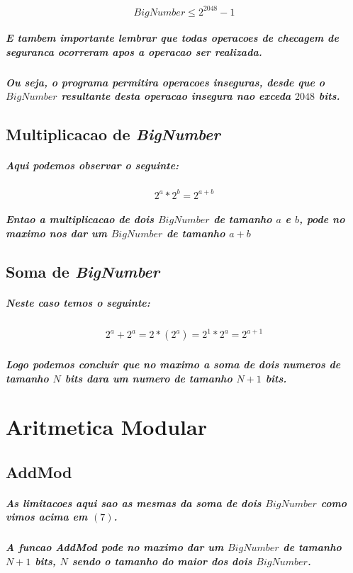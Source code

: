 \documentclass[12pt,twoside, a4paper, twocolumn]{article}
\begin{document}
\begin{equation}
    BigNumber \le 2^{2048} - 1
\end{equation}

\subparagraph*{E tambem importante lembrar que todas operacoes de checagem de seguranca ocorreram \emph{apos} a operacao ser realizada.}

\subparagraph*{Ou seja, o programa permitira operacoes inseguras, desde que o $BigNumber$ resultante desta operacao insegura nao exceda $2048$ bits.}

\subsection{Multiplicacao de \emph{BigNumber}}

\subparagraph*{Aqui podemos observar o seguinte:}

\begin{equation}
    2^a * 2^b = 2^{a + b}
\end{equation}

\subparagraph*{Entao a multiplicacao de dois $BigNumber$ de tamanho $a$ e $b$, pode no maximo nos dar um $BigNumber$ de tamanho $a+b$}

\subsection{Soma de \emph{BigNumber}}

\subparagraph*{Neste caso temos o seguinte:}

\begin{equation}
    \begin{aligned}
        2^a + 2^a = 2*(2^a) = 2^1 * 2^a = 2^{a + 1}
    \end{aligned}
\end{equation}

\subparagraph*{Logo podemos concluir que no maximo a soma de dois numeros de tamanho $N$ bits dara um numero de tamanho $N+1$ bits.}

\section{Aritmetica Modular}

\subsection{AddMod}

\subparagraph*{As limitacoes aqui sao as mesmas da soma de dois $BigNumber$ como vimos acima em $(7)$. }
\subparagraph*{A funcao AddMod pode no maximo dar um $BigNumber$ de tamanho $N+1$ bits, $N$ sendo o tamanho do maior dos dois $BigNumber$.}
\end{document}
